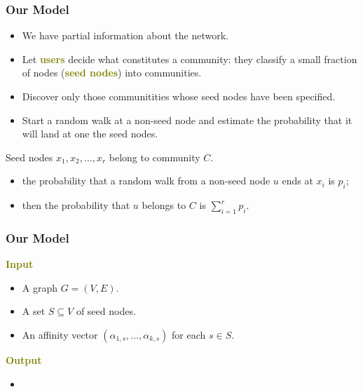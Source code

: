 \documentclass[xcolor=table]{beamer}
\newcommand{\highlight}[1]{\textcolor{olive}{\textbf{#1}}}
\begin{document}
\begin{frame}[t]
\frametitle{Our Model}
\begin{itemize}
	\item We have partial information about the network. 
	\item Let \highlight{users} decide what constitutes a community: they classify
		a small fraction of nodes (\highlight{seed nodes}) into communities.
	\item Discover only those communitities whose seed nodes have been specified.
	\item Start a random walk at a non-seed node and estimate the probability 
		that it will land at one the seed nodes.
\end{itemize}

Seed nodes $x_1, x_2, \ldots, x_r$ belong to community $C$. 
\begin{itemize}
	\item the probability that a random walk from a non-seed node $u$ 
		ends at $x_i$ is $p_i$; 
	\item then the probability that $u$ belongs to $C$ is $\sum_{i = 1}^r p_i$.
\end{itemize}
\end{frame}

\begin{frame}[t]
\frametitle{Our Model}
\highlight{Input}
\begin{itemize}
	\item A graph $G = (V,E)$.
	\item A set $S \subseteq V$ of seed nodes.
	\item An affinity vector $(\alpha_{1, s}, \ldots, \alpha_{k, s})$ for each $s \in S$.
\end{itemize}

\medskip

\highlight{Output}
\begin{itemize}
	\item 
\end{itemize}
\end{frame}
\end{document}
